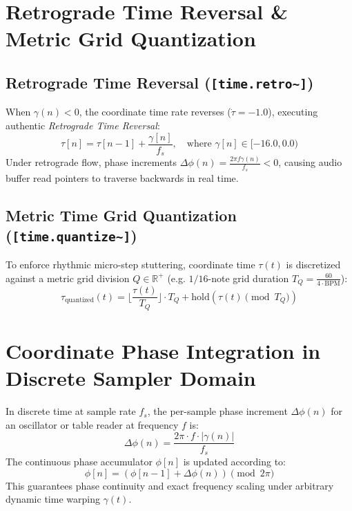\documentclass[11pt,a4paper]{article}
\begin{document}
\section{Retrograde Time Reversal \& Metric Grid Quantization}
\subsection{Retrograde Time Reversal (\texttt{[time.retro\textasciitilde{}]})}
When $\gamma(n) < 0$, the coordinate time rate reverses ($\dot{\tau} = -1.0$), executing authentic \textit{Retrograde Time Reversal}:
\begin{equation}
\tau[n] = \tau[n-1] + \frac{\gamma[n]}{f_s}, \quad \text{where } \gamma[n] \in [-16.0, 0.0)
\end{equation}
Under retrograde flow, phase increments $\Delta \phi(n) = \frac{2\pi f \gamma(n)}{f_s} < 0$, causing audio buffer read pointers to traverse backwards in real time.

\subsection{Metric Time Grid Quantization (\texttt{[time.quantize\textasciitilde{}]})}
To enforce rhythmic micro-step stuttering, coordinate time $\tau(t)$ is discretized against a metric grid division $Q \in \mathbb{R}^+$ (e.g. $1/16$-note grid duration $T_Q = \frac{60}{4 \cdot \text{BPM}}$):
\begin{equation}
\tau_{\text{quantized}}(t) = \lfloor \frac{\tau(t)}{T_Q} \rfloor \cdot T_Q + \text{hold}\left(\tau(t) \pmod{T_Q}\right)
\end{equation}

\section{Coordinate Phase Integration in Discrete Sampler Domain}
In discrete time at sample rate $f_s$, the per-sample phase increment $\Delta \phi(n)$ for an oscillator or table reader at frequency $f$ is:
\begin{equation}
\Delta \phi(n) = \frac{2\pi \cdot f \cdot |\gamma(n)|}{f_s}
\end{equation}
The continuous phase accumulator $\phi[n]$ is updated according to:
\begin{equation}
\phi[n] = \left( \phi[n-1] + \Delta \phi(n) \right) \pmod{2\pi}
\end{equation}
This guarantees phase continuity and exact frequency scaling under arbitrary dynamic time warping $\gamma(t)$.
\end{document}

